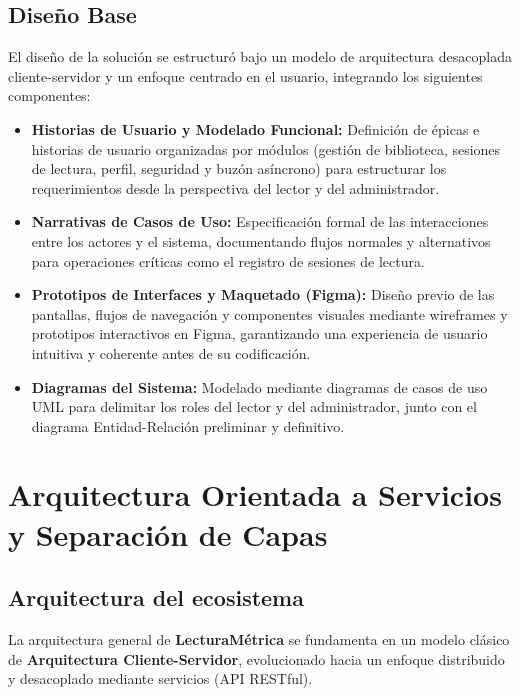\documentclass[12pt, atypical, journal]{article}
\begin{document}
\subsection{Diseño Base}
El diseño de la solución se estructuró bajo un modelo de arquitectura desacoplada cliente-servidor y un enfoque centrado en el usuario, integrando los siguientes componentes:
\begin{itemize}
    \item \textbf{Historias de Usuario y Modelado Funcional:} Definición de épicas e historias de usuario organizadas por módulos (gestión de biblioteca, sesiones de lectura, perfil, seguridad y buzón asíncrono) para estructurar los requerimientos desde la perspectiva del lector y del administrador.
    \item \textbf{Narrativas de Casos de Uso:} Especificación formal de las interacciones entre los actores y el sistema, documentando flujos normales y alternativos para operaciones críticas como el registro de sesiones de lectura.
    \item \textbf{Prototipos de Interfaces y Maquetado (Figma):} Diseño previo de las pantallas, flujos de navegación y componentes visuales mediante wireframes y prototipos interactivos en Figma, garantizando una experiencia de usuario intuitiva y coherente antes de su codificación.
    \item \textbf{Diagramas del Sistema:} Modelado mediante diagramas de casos de uso UML para delimitar los roles del lector y del administrador, junto con el diagrama Entidad-Relación preliminar y definitivo.
\end{itemize}

\newpage

\section{Arquitectura Orientada a Servicios y Separación de Capas}

\subsection{Arquitectura del ecosistema}
La arquitectura general de \textbf{LecturaMétrica} se fundamenta en un modelo clásico de \textbf{Arquitectura Cliente-Servidor}, evolucionado hacia un enfoque distribuido y desacoplado mediante servicios (API RESTful).
\end{document}
